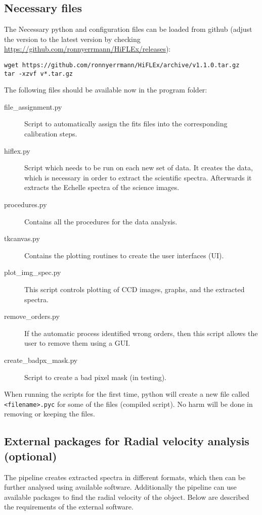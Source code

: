 \documentclass[10pt,a4paper]{article}
\begin{document}
\subsection{Necessary files}

\noindent The Necessary python and configuration files can be loaded from github (adjust the version to the latest version by checking \url{https://github.com/ronnyerrmann/HiFLEx/releases}):
\begin{lstlisting}[style=base]
wget https://github.com/ronnyerrmann/HiFLEx/archive/v1.1.0.tar.gz
tar -xzvf v*.tar.gz
\end{lstlisting}

\noindent The following files should be available now in the program folder:
\begin{description}
 \item[file\_assignment.py] Script to automatically assign the fits files into the corresponding calibration steps.
 \item[hiflex.py] Script which needs to be run on each new set of data. It creates the data, which is necessary in order to extract the scientific spectra. Afterwards it extracts the Echelle spectra of the science images.
 \item[procedures.py] Contains all the procedures for the data analysis.
 \item[tkcanvas.py] Contains the plotting routines to create the user interfaces (UI).
 \item[plot\_img\_spec.py] This script controls plotting of CCD images, graphs, and the extracted spectra.
 \item[remove\_orders.py] If the automatic process identified wrong orders, then this script allows the user to remove them using a GUI.
 \item[create\_badpx\_mask.py] Script to create a bad pixel mask (in testing).
\end{description}

When running the scripts for the first time, python will create a new file called \verb|<filename>.pyc| for some of the files (compiled script). No harm will be done in removing or keeping the files.

\subsection{External packages for Radial velocity analysis (optional)}
\label{Sec:RV_packages}
The pipeline creates extracted spectra in different formats, which then can be further analysed using available software. Additionally the pipeline can use available packages to find the radial velocity of the object. Below are described the requirements of the external software.
\end{document}
